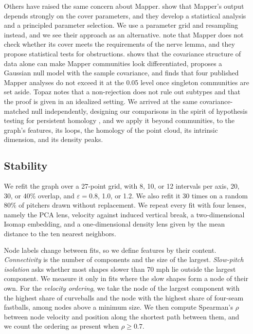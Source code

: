 \documentclass{article}
\theoremstyle{definition}
\theoremstyle{remark}
\begin{document}
Others have raised the same concern about Mapper.
\textcite{carrieremicheloudot2018} show that Mapper's output depends strongly on the cover parameters, and they develop a statistical analysis and a principled parameter selection. We use a parameter grid and resampling instead, and we see their approach as an alternative.
\textcite{vejdemojohansson2018certified} note that Mapper does not check whether its cover meets the requirements of the nerve lemma, and they propose statistical tests for obstructions.
\textcite{topaz2026null} shows that the covariance structure of data alone can make Mapper communities look differentiated, proposes a Gaussian null model with the sample covariance, and finds that four published Mapper analyses do not exceed it at the 0.05 level once singleton communities are set aside. Topaz notes that a non-rejection does not rule out subtypes and that the proof is given in an idealized setting.
We arrived at the same covariance-matched null independently, designing our comparisons in the spirit of hypothesis testing for persistent homology \parencite{robinsonturner2017,blumberg2014}, and we apply it beyond communities, to the graph's features, its loops, the homology of the point cloud, its intrinsic dimension, and its density peaks.

\subsection{Stability}
We refit the graph over a 27-point grid, with 8, 10, or 12 intervals per axis, 20, 30, or 40\% overlap, and $\varepsilon = 0.8$, 1.0, or 1.2.
We also refit it 30 times on a random 80\% of pitchers drawn without replacement.
We repeat every fit with four lenses, namely the PCA lens, velocity against induced vertical break, a two-dimensional Isomap embedding, and a one-dimensional density lens given by the mean distance to the ten nearest neighbors.

Node labels change between fits, so we define features by their content.
\emph{Connectivity} is the number of components and the size of the largest.
\emph{Slow-pitch isolation} asks whether most shapes slower than 70 mph lie outside the largest component.
We measure it only in fits where the slow shapes form a node of their own.
For the \emph{velocity ordering}, we take the node of the largest component with the highest share of curveballs and the node with the highest share of four-seam fastballs, among nodes above a minimum size. We then compute Spearman's $\rho$ between node velocity and position along the shortest path between them, and we count the ordering as present when $\rho \ge 0.7$.
\end{document}
